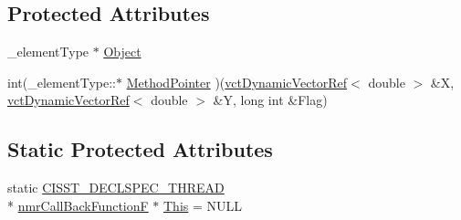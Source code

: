 \subsection*{Protected Attributes}
\begin{DoxyCompactItemize}
\item 
\-\_\-element\-Type $\ast$ \hyperlink{classnmr_call_back_function_f_af32244c85b446c1724460470280b999f}{Object}
\item 
int(\-\_\-element\-Type\-::$\ast$ \hyperlink{classnmr_call_back_function_f_aea3dda0eedac298284708f16895a3a9f}{Method\-Pointer} )(\hyperlink{classvct_dynamic_vector_ref}{vct\-Dynamic\-Vector\-Ref}$<$ double $>$ \&X, \hyperlink{classvct_dynamic_vector_ref}{vct\-Dynamic\-Vector\-Ref}$<$ double $>$ \&Y, long int \&Flag)
\end{DoxyCompactItemize}
\subsection*{Static Protected Attributes}
\begin{DoxyCompactItemize}
\item 
static \hyperlink{nmr_call_back_8h_a6e1f65051a0942715fa65ef4193e39e1}{C\-I\-S\-S\-T\-\_\-\-D\-E\-C\-L\-S\-P\-E\-C\-\_\-\-T\-H\-R\-E\-A\-D} \\*
\hyperlink{classnmr_call_back_function_f}{nmr\-Call\-Back\-Function\-F} $\ast$ \hyperlink{classnmr_call_back_function_f_aade0d68710d0883015d2908fcd831b82}{This} = N\-U\-L\-L
\end{DoxyCompactItemize}



